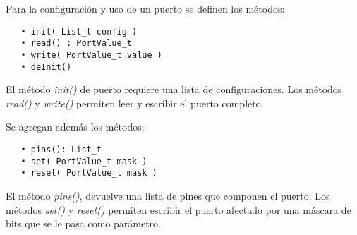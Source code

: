 Para la configuración y uso de un puerto se definen los métodos:

\begin{verbatim}
   • init( List_t config )
   • read() : PortValue_t
   • write( PortValue_t value )
   • deInit()
\end{verbatim}

El método \emph{init()} de puerto requiere una lista de configuraciones. Los métodos \emph{read()} y \emph{write()} permiten leer y escribir el puerto completo.

Se agregan además los métodos:

\begin{verbatim}
   • pins(): List_t
   • set( PortValue_t mask )
   • reset( PortValue_t mask )
\end{verbatim}

El método \emph{pins()}, devuelve una lista de pines que componen el puerto. Los métodos \emph{set()} y \emph{reset()} permiten escribir el puerto afectado por una máscara de bits que se le pasa como parámetro.






